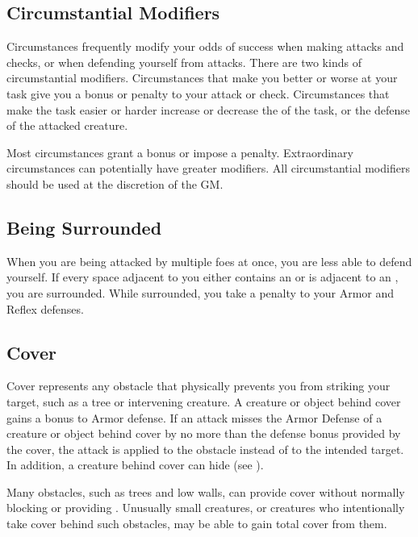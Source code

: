     \subsection{Circumstantial Modifiers}

        Circumstances frequently modify your odds of success when making attacks and checks, or when defending yourself from attacks.
        There are two kinds of circumstantial modifiers.
        Circumstances that make you better or worse at your task give you a bonus or penalty to your attack or check.
        Circumstances that make the task easier or harder increase or decrease the  of the task, or the defense of the attacked creature.

        Most circumstances grant a  bonus or impose a  penalty.
        Extraordinary circumstances can potentially have greater modifiers.
        All circumstantial modifiers should be used at the discretion of the GM.\@

    \subsection{Being Surrounded}\label{Being Surrounded}
        When you are being attacked by multiple foes at once, you are less able to defend yourself.
        If every space adjacent to you either contains an  or is adjacent to an , you are surrounded.
        While surrounded, you take a  penalty to your Armor and Reflex defenses.

    \subsection{Cover}\label{Cover}

        Cover represents any obstacle that physically prevents you from striking your target, such as a tree or intervening creature.
        A creature or object behind cover gains a  bonus to Armor defense.
        If an attack misses the Armor Defense of a creature or object behind cover by no more than the defense bonus provided by the cover,
        the attack is applied to the obstacle instead of to the intended target.
        In addition, a creature behind cover can hide (see ).

         Many obstacles, such as trees and low walls, can provide cover without normally blocking  or providing .
        Unusually small creatures, or creatures who intentionally take cover behind such obstacles, may be able to gain total cover from them.

